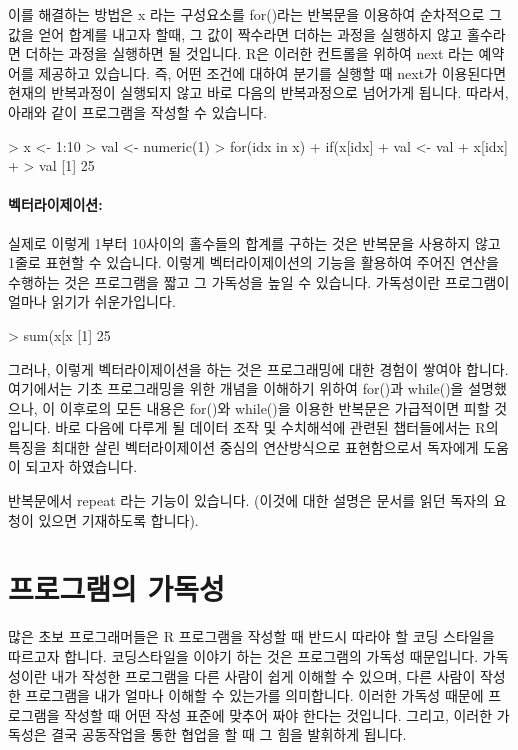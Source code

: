 \documentclass{book}
\begin{document}
이를 해결하는 방법은 x 라는 구성요소를 for()라는 반복문을 이용하여 순차적으로 그 값을 얻어 합계를 내고자 할때, 그 값이 짝수라면 더하는 과정을 실행하지 않고 홀수라면 더하는 과정을 실행하면 될 것입니다.
R은 이러한 컨트롤을 위하여 next 라는 예약어를 제공하고 있습니다.
즉, 어떤 조건에 대하여 분기를 실행할 때 next가 이용된다면 현재의 반복과정이 실행되지 않고 바로 다음의 반복과정으로 넘어가게 됩니다. 
따라서, 아래와 같이 프로그램을 작성할 수 있습니다. 

\begin{Schunk}
\begin{Soutput}
> x <- 1:10
> val <- numeric(1)
> for(idx in x){
+ if(x[idx] %
+ val <- val + x[idx]
+ }
> val
[1] 25
\end{Soutput}
\end{Schunk}

\paragraph{벡터라이제이션: }

실제로 이렇게 1부터 10사이의 홀수들의 합계를 구하는 것은 반복문을 사용하지 않고 1줄로 표현할 수 있습니다.
이렇게 벡터라이제이션의 기능을 활용하여 주어진 연산을 수행하는 것은 프로그램을 짧고 그 가독성을 높일 수 있습니다. 
가독성이란 프로그램이 얼마나 읽기가 쉬운가입니다.

\begin{Schunk}
\begin{Soutput}
> sum(x[x %
[1] 25
\end{Soutput}
\end{Schunk}

그러나, 이렇게 벡터라이제이션을 하는 것은 프로그래밍에 대한 경험이 쌓여야 합니다. 
여기에서는 기초 프로그래밍을 위한 개념을 이해하기 위하여 for()과 while()을 설명했으나, 이 이후로의 모든 내용은 for()와 while()을 이용한 반복문은 가급적이면 피할 것입니다.
바로 다음에 다루게 될 데이터 조작 및 수치해석에 관련된 챕터들에서는 R의 특징을 최대한 살린 벡터라이제이션 중심의 연산방식으로 표현함으로서 독자에게 도움이 되고자 하였습니다.

반복문에서 repeat 라는 기능이 있습니다. (이것에 대한 설명은 문서를 읽던 독자의 요청이 있으면 기재하도록 합니다).

\section{프로그램의 가독성}

많은 초보 프로그래머들은 R 프로그램을 작성할 때 반드시 따라야 할 코딩 스타일을 따르고자 합니다.
코딩스타일을 이야기 하는 것은 프로그램의 가독성 때문입니다. 
가독성이란 내가 작성한 프로그램을 다른 사람이 쉽게 이해할 수 있으며, 다른 사람이 작성한 프로그램을 내가 얼마나 이해할 수 있는가를 의미합니다.
이러한 가독성 때문에 프로그램을 작성할 때 어떤 작성 표준에 맞추어 짜야 한다는 것입니다.
그리고, 이러한 가독성은 결국 공동작업을 통한 협업을 할 때 그 힘을 발휘하게 됩니다. 
\end{document}
